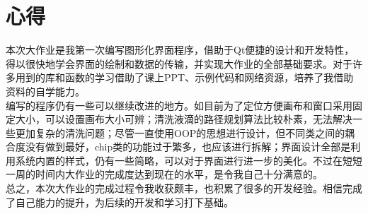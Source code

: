 \documentclass[12pt, a4paper]{article}
\begin{document}
		\section{心得}
			本次大作业是我第一次编写图形化界面程序，借助于Qt便捷的设计和开发特性，得以很快地学会界面的绘制和数据的传输，并实现大作业的全部基础要求。对于许多用到的库和函数的学习借助了课上PPT、示例代码和网络资源，培养了我借助资料的自学能力。 \\ \hspace*{0.8cm}
			编写的程序仍有一些可以继续改进的地方。如目前为了定位方便画布和窗口采用固定大小，可以设置画布大小可辨；清洗液滴的路径规划算法比较朴素，无法解决一些更加复杂的清洗问题；尽管一直使用OOP的思想进行设计，但不同类之间的耦合度没有做到最好，chip类的功能过于繁多，也应该进行拆解；界面设计全部是利用系统内置的样式，仍有一些简略，可以对于界面进行进一步的美化。不过在短短一周的时间内大作业的完成度达到现在的水平，是令我自己十分满意的。 \\ \hspace*{0.8cm}
			总之，本次大作业的完成过程令我收获颇丰，也积累了很多的开发经验。相信完成了自己能力的提升，为后续的开发和学习打下基础。
			
\end{document}

